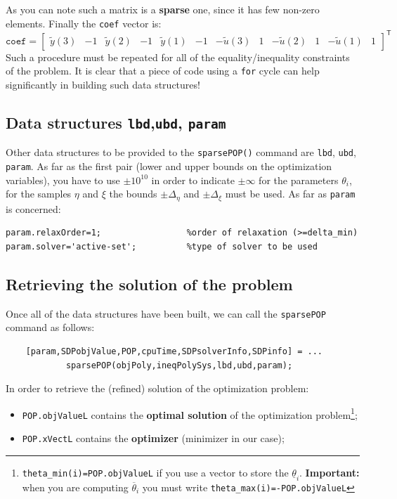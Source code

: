 \noindent
As you can note such a matrix is a \textbf{sparse} one, since it has few non-zero elements. Finally the \texttt{coef} vector is:
{{
    \begin{equation*}
        \texttt{coef}=\begin{bmatrix}
            \tilde{y}(3)&-1& \tilde{y}(2)& -1 &\tilde{y}(1) & -1& -\tilde{u}(3) & 1& -\tilde{u}(2) & 1 & -\tilde{u}(1) & 1
        \end{bmatrix}^\textsf{T}
    \end{equation*}
}}
Such a procedure must be repeated for all of the equality/inequality constraints of the problem. It is clear that a piece of code using a \texttt{for} cycle can help significantly in building such data structures! 

\subsection{Data structures \texttt{lbd},\texttt{ubd}, \texttt{param} }
\noindent
Other data structures to be provided to the \texttt{sparsePOP()} command are \texttt{lbd}, \texttt{ubd}, \texttt{param}. As far as the first pair (lower and upper bounds on the optimization variables), you have to use $\pm{10}^{10}$ in order to indicate $\pm{\infty}$ for the parameters $\theta_i$, for the samples $\eta$ and $\xi$ the bounds $\pm\Delta_\eta$ and $\pm\Delta_\xi$ must be used. As far as \texttt{param} is concerned:
\begin{verbatim}
param.relaxOrder=1;                 %order of relaxation (>=delta_min)
param.solver='active-set';          %type of solver to be used
\end{verbatim}

\subsection{Retrieving the solution of the problem}
Once all of the data structures have been built, we can call the \texttt{sparsePOP} command as follows: 
\begin{verbatim}
    [param,SDPobjValue,POP,cpuTime,SDPsolverInfo,SDPinfo] = ...
            sparsePOP(objPoly,ineqPolySys,lbd,ubd,param);
\end{verbatim}

\noindent
In order to retrieve the (refined) solution of the optimization problem:
\begin{itemize}
    \itemsep0em
    \item \texttt{POP.objValueL} contains the \textbf{optimal solution} of the optimization problem\footnote{\texttt{theta\_min(i)=POP.objValueL} if you use a vector to store the $\underline{\theta}_i$. \textbf{Important: } when you are computing $\overline{\theta}_i$ you must write \texttt{theta\_max(i)=-POP.objValueL}};
    \item \texttt{POP.xVectL} contains the \textbf{optimizer} (minimizer in our case); 
\end{itemize}


 